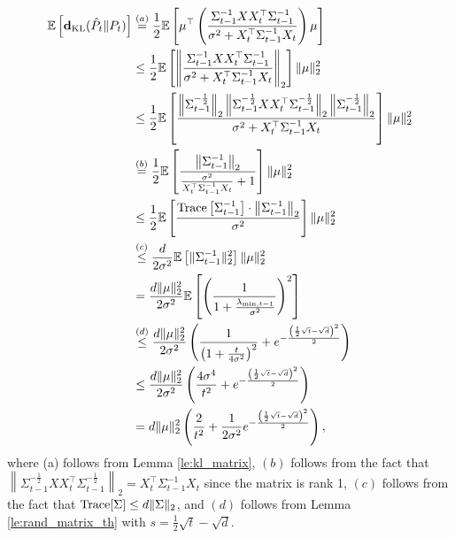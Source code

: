 \documentclass[twoside,11pt]{article}
\renewenvironment{proof}{\par\noindent{\bf Proof\ }}{\hfill\BlackBox\\[2mm]}
\newenvironment{proof}{\par\noindent{\bf Proof\ }}{\hfill\BlackBox\\[2mm]}
\def\KL{\mathbf{d}_{\mathrm{KL}}}
\def\E{\mathbb{E}}
\begin{document}
\wrongMean*
\begin{proof}
    \begin{align*}
        \E\left[\KL(\hat{P}_t\|P_t)\right]
        & \overset{(a)}{=} \frac{1}{2}\E\left[\mu^\top\left(\frac{\Sigma^{-1}_{t-1}XX_t^\top\Sigma^{-1}_{t-1}}{\sigma^2 + X_t^\top \Sigma^{-1}_{t-1} X_t}\right)\mu\right]\\
        & \leq \frac{1}{2}\E\left[\left\|\frac{\Sigma^{-1}_{t-1}XX_t^\top\Sigma^{-1}_{t-1}}{\sigma^2 + X_t^\top \Sigma^{-1}_{t-1} X_t}\right\|_2\right]\|\mu\|_2^2\\
        & \leq \frac{1}{2}\E\left[\frac{\left\|\Sigma^{-\frac{1}{2}}_{t-1}\right\|_2 \left\|\Sigma^{-\frac{1}{2}}_{t-1}XX_t^\top\Sigma^{-\frac{1}{2}}_{t-1}\right\|_2\left\|\Sigma^{-\frac{1}{2}}_{t-1}\right\|_2}{\sigma^2 + X_t^\top \Sigma^{-1}_{t-1} X_t}\right]\|\mu\|_2^2\\
        & \overset{(b)}{=} \frac{1}{2}\E\left[\frac{\left\|\Sigma^{-1}_{t-1}\right\|_2}{\frac{\sigma^2}{X_t^\top \Sigma^{-1}_{t-1}X_t} + 1}\right]\|\mu\|^2_2\\
        & \leq \frac{1}{2}\E\left[\frac{{\rm Trace}\left[\Sigma^{-1}_{t-1}\right]\cdot\left\|\Sigma^{-1}_{t-1}\right\|_2}{\sigma^2}\right]\|\mu\|^2_2\\
        & \overset{(c)}{\leq} \frac{d}{2\sigma^2}\E\left[\|\Sigma^{-1}_{t-1}\|^2_2\right]\|\mu\|^2_2\\
        &  = \frac{d\|\mu\|^2_2}{2\sigma^2}\E\left[\left(\frac{1}{1 + \frac{\lambda_{{\rm min}, t-1}}{\sigma^2}}\right)^2\right]\\
        & \overset{(d)}{\leq} \frac{d\|\mu\|^2_2}{2\sigma^2}\left(\frac{1}{\left(1 + \frac{t}{4\sigma^2}\right)^2} + e^{-\frac{\left(\frac{1}{2}\sqrt{t}-\sqrt{d}\right)^2}{2}}\right)\\
        & \leq \frac{d\|\mu\|^2_2}{2\sigma^2}\left(\frac{4\sigma^4}{t^2} + e^{-\frac{\left(\frac{1}{2}\sqrt{t}-\sqrt{d}\right)^2}{2}}\right)\\
        & = d\|\mu\|_2^2\left(\frac{2}{t^2} + \frac{1}{2\sigma^2}e^{-\frac{\left(\frac{1}{2}\sqrt{t}-\sqrt{d}\right)^2}{2}}\right),
    \end{align*}
    where (a) follows from Lemma \ref{le:kl_matrix}, $(b)$ follows from the fact that $\left\|\Sigma^{-\frac{1}{2}}_{t-1}XX_t^\top\Sigma^{-\frac{1}{2}}_{t-1}\right\|_2 = X_t^\top \Sigma^{-1}_{t-1}X_t$ since the matrix is rank 1, $(c)$ follows from the fact that ${\rm Trace}[\Sigma] \leq d\|\Sigma\|_2$, and $(d)$ follows from Lemma \ref{le:rand_matrix_th} with $s = \frac{1}{2}\sqrt{t} - \sqrt{d}$.
\end{proof}
\end{document}
